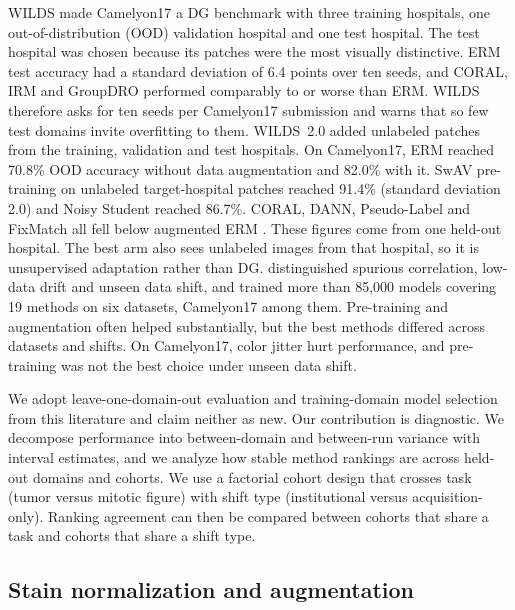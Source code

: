 WILDS \citep{koh2021wilds} made Camelyon17 \citep{bandi2019camelyon17} a DG
benchmark with three training hospitals, one out-of-distribution (OOD)
validation hospital and one test hospital. The test hospital was chosen because
its patches were the most visually distinctive. ERM test accuracy had a
standard deviation of 6.4 points over ten seeds, and CORAL, IRM and GroupDRO
performed comparably to or worse than ERM. WILDS therefore asks for ten seeds
per Camelyon17 submission and warns that so few test domains invite overfitting
to them. WILDS~2.0 \citep{sagawa2022extending} added unlabeled patches from the
training, validation and test hospitals. On Camelyon17, ERM reached 70.8\% OOD
accuracy without data augmentation and 82.0\% with it. SwAV pre-training on
unlabeled target-hospital patches reached 91.4\% (standard deviation 2.0) and
Noisy Student reached 86.7\%. CORAL, DANN, Pseudo-Label and FixMatch all fell
below augmented ERM \citep[Table~2]{sagawa2022extending}. These figures come
from one held-out hospital. The best arm also sees unlabeled images from that
hospital, so it is unsupervised adaptation rather than DG.
\citet{wiles2022fine} distinguished spurious correlation, low-data drift and
unseen data shift, and trained more than 85,000 models covering 19 methods on
six datasets, Camelyon17 among them. Pre-training and augmentation often helped
substantially, but the best methods differed across datasets and shifts. On
Camelyon17, color jitter hurt performance, and pre-training was not the best
choice under unseen data shift.

We adopt leave-one-domain-out evaluation and training-domain model selection
from this literature and claim neither as new. Our contribution is diagnostic.
We decompose performance into between-domain and between-run variance with
interval estimates, and we analyze how stable method rankings are across
held-out domains and cohorts. We use a factorial cohort design that crosses task
(tumor versus mitotic figure) with shift type (institutional versus
acquisition-only). Ranking agreement can then be compared between cohorts that
share a task and cohorts that share a shift type.

\subsection{Stain normalization and augmentation}
\label{sec:related-stain}

